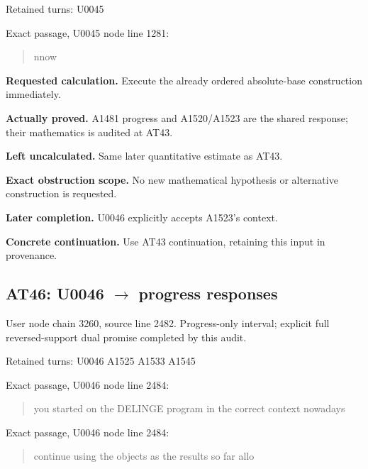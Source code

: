 \documentclass[10pt,a4paper,oneside]{report}
\begin{document}
Retained turns: U0045
\protect{}

Exact passage, U0045 node
\protect{} line 1281:

\begin{quote}
nnow
\end{quote}

\textbf{Requested calculation.} Execute the already ordered
absolute-base construction immediately.

\textbf{Actually proved.} A1481 progress and A1520/A1523 are the shared
response; their mathematics is audited at AT43.

\textbf{Left uncalculated.} Same later quantitative estimate as AT43.

\textbf{Exact obstruction scope.} No new mathematical hypothesis or
alternative construction is requested.

\textbf{Later completion.} U0046 explicitly accepts A1523's context.

\textbf{Concrete continuation.} Use AT43 continuation, retaining this
input in provenance.

\subsection{\texorpdfstring{AT46: U0046
\allowbreak{}\ensuremath{→}\allowbreak{} progress
responses}{AT46: U0046  progress responses}}\label{at46-u0046-progress-responses}

User node \protect{} chain
3260, source line 2482. Progress-only interval; explicit full
reversed-support dual promise completed by this audit.

Retained turns: U0046
\protect{} A1525
\protect{} A1533
\protect{} A1545
\protect{}

Exact passage, U0046 node
\protect{} line 2484:

\begin{quote}
you started on the DELINGE program in the correct context nowadays
\end{quote}

Exact passage, U0046 node
\protect{} line 2484:

\begin{quote}
continue using the objects as the results so far allo
\end{quote}
\end{document}
